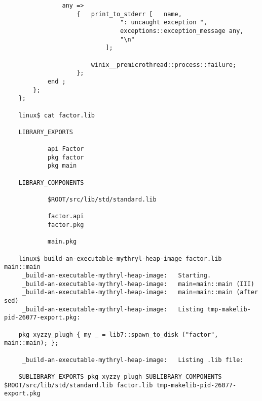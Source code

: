 \begin{verbatim}
                any =>
                    {   print_to_stderr [   name,
                                ": uncaught exception ",
                                exceptions::exception_message any,
                                "\n"
                            ];

                        winix__premicrothread::process::failure;
                    };
            end ;
        };
    };

    linux$ cat factor.lib

    LIBRARY_EXPORTS

            api Factor
            pkg factor
            pkg main

    LIBRARY_COMPONENTS

            $ROOT/src/lib/std/standard.lib

            factor.api
            factor.pkg

            main.pkg

    linux$ build-an-executable-mythryl-heap-image factor.lib main::main
     _build-an-executable-mythryl-heap-image:   Starting.
     _build-an-executable-mythryl-heap-image:   main=main::main (III)
     _build-an-executable-mythryl-heap-image:   main=main::main (after sed)
     _build-an-executable-mythryl-heap-image:   Listing tmp-makelib-pid-26077-export.pkg:

    pkg xyzzy_plugh { my _ = lib7::spawn_to_disk ("factor", main::main); };

     _build-an-executable-mythryl-heap-image:   Listing .lib file:

    SUBLIBRARY_EXPORTS pkg xyzzy_plugh SUBLIBRARY_COMPONENTS $ROOT/src/lib/std/standard.lib factor.lib tmp-makelib-pid-26077-export.pkg


\end{verbatim}
